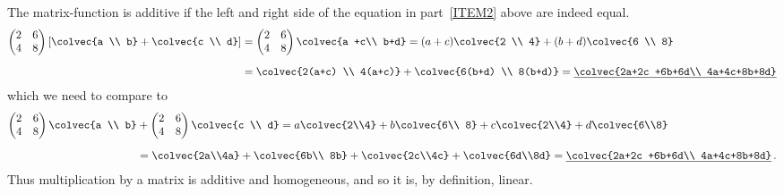 \begin{example}
The matrix-function is additive if the left and right side of the equation  in part~\ref{ITEM2} above are indeed equal. 
\begin{align*}
     \begin{pmatrix}
      2             &6 \\
      4            &8
    \end{pmatrix}
   \left[ \colvec{a \\ b} +\colvec{c \\ d} \right] 
   &= 
        \begin{pmatrix}
      2             &6 \\
      4            &8
    \end{pmatrix}
    \colvec{a +c\\ b+d}  
   =
        (a+c) \colvec{2 \\ 4} 
        +
         (b+d) \colvec{6 \\ 8}\\[2mm]&
         =
        \colvec{2(a+c) \\ 4(a+c)} 
        +
        \colvec{6(b+d) \\ 8(b+d)}
             =
       \underline{ \colvec{2a+2c +6b+6d\\ 4a+4c+8b+8d} }
\end{align*}
 which we need to compare to  
\begin{align*}
  \begin{pmatrix}
      2             &6 \\
      4            &8
    \end{pmatrix}
\colvec{a \\ b}
 &  +
    \begin{pmatrix}
      2             &6 \\
      4            &8
    \end{pmatrix}
    \colvec{c \\ d}
=
a\colvec{2\\4} + b\colvec{6\\ 8} + c\colvec{2\\4} +d\colvec{6\\8}\\[2mm]&
=\colvec{2a\\4a} + \colvec{6b\\ 8b} + \colvec{2c\\4c} +\colvec{6d\\8d}
=\underline{\colvec{2a+2c +6b+6d\\ 4a+4c+8b+8d} }\, .
\end{align*}
Thus multiplication by a  matrix is additive and homogeneous, and so it is, by definition, linear. 
\end{example}


